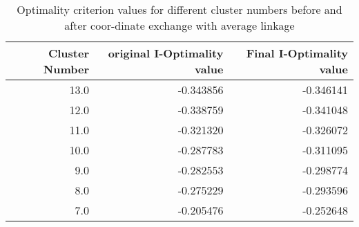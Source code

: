 \begin{table}[htbp]
\centering
\begin{tabular}{rrr}
\toprule
   Cluster Number &   original I-Optimality value &   Final I-Optimality value \\
\midrule
             13.0 &                     -0.343856 &                  -0.346141 \\
             12.0 &                     -0.338759 &                  -0.341048 \\
             11.0 &                     -0.321320 &                  -0.326072 \\
             10.0 &                     -0.287783 &                  -0.311095 \\
              9.0 &                     -0.282553 &                  -0.298774 \\
              8.0 &                     -0.275229 &                  -0.293596 \\
              7.0 &                     -0.205476 &                  -0.252648 \\
\bottomrule
\end{tabular}
\caption{Optimality criterion values for different cluster numbers before and after coor-dinate exchange with average linkage}
\label{tab:Optimality criterion values for different cluster numbers before and after coor-dinate exchange with average linkage}
\end{table}